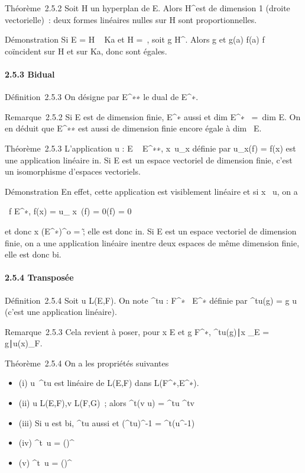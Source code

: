 \documentclass[]{article}
\begin{document}
Théorème~2.5.2 Soit H un hyperplan de E. Alors H^\bot est de
dimension 1 (droite vectorielle)~: deux formes linéaires nulles sur H
sont proportionnelles.

Démonstration Si E = H \oplus~ Ka et H =\
\mathrmKerf, soit g \in H^\bot. Alors g et 
g(a) \over f(a) f coïncident sur H et sur Ka, donc sont
égales.

\paragraph{2.5.3 Bidual}

Définition~2.5.3 On désigne par E^∗∗ le dual de
E^∗.

Remarque~2.5.2 Si E est de dimension finie, E^∗ aussi et
dim E^∗~ =\
dim E. On en déduit que E^∗∗ est aussi de dimension finie
encore égale à dim~ E.

Théorème~2.5.3 L'application u : E \rightarrow~ E^∗∗,
x\mapsto~u\_x définie par u\_x(f) =
f(x) est une application linéaire in\jmathective. Si E est un espace
vectoriel de dimension finie, c'est un isomorphisme d'espaces
vectoriels.

Démonstration En effet, cette application est visiblement linéaire et si
x \in\mathrmKer~u, on a

\forall~f \in E^∗, f(x) = u\_ x~(f) =
0(f) = 0

et donc x \in (E^∗)^o =
\0\~; elle est donc in\jmathective. Si E
est un espace vectoriel de dimension finie, on a une application
linéaire in\jmathective entre deux espaces de même dimension finie, elle est
donc bi\jmathective.

\paragraph{2.5.4 Transposée}

Définition~2.5.4 Soit u \in L(E,F). On note ^tu :
F^∗\rightarrow~ E^∗ définie par ^tu(g) = g \cdot u
(c'est une application linéaire).

Remarque~2.5.3 Cela revient à poser, pour x \in E et g \in F^∗,
\langle
^tu(g)∣x\rangle
\_E =\langle
g∣u(x)\rangle \_F.

Théorème~2.5.4 On a les propriétés suivantes

\begin{itemize}
\itemsep1pt\parskip0pt
\item
  (i) u\mapsto~^tu est linéaire de L(E,F)
  dans L(F^∗,E^∗).
\item
  (ii) u \in L(E,F),v \in L(F,G)~; alors ^t(v \cdot u) =
  ^tu \cdot^tv
\item
  (iii) Si u est bi\jmathective, ^tu aussi et
  (^tu)^-1 = ^t(u^-1)
\item
  (iv)
  \mathrmKer^t~u
  =
  (\mathrmImu)^\bot~
\item
  (v)
  \mathrmIm^t~u =
  (\mathrmKeru)^\bot~
\end{itemize}
\end{document}
